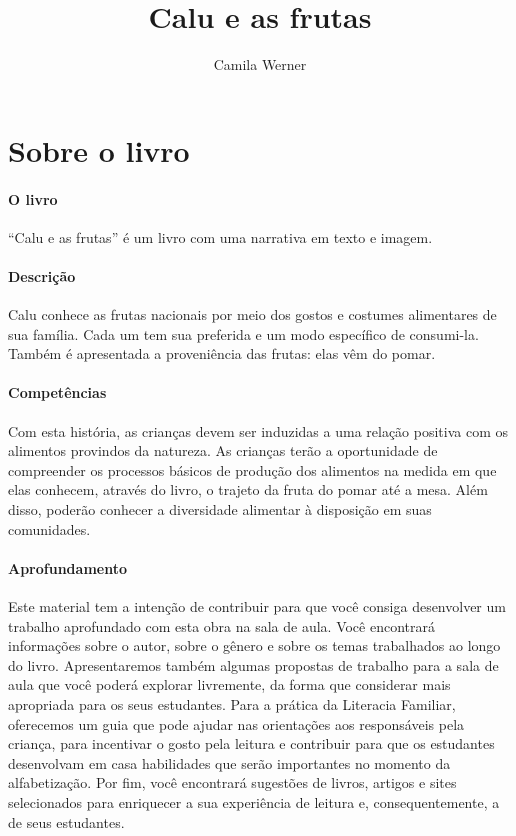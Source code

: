 \documentclass[11pt]{extarticle}
\newcommand{\AutorLivro}{Camila Werner}
\newcommand{\TituloLivro}{Calu e as frutas}
\newcommand{\colaborador}{{Paulo Pompermaier e Renier Silva}}
\begin{document}
\title{\TituloLivro}
\author{\AutorLivro}
\def\authornotes{\colaborador}

\date{}
\maketitle


\tableofcontents



\section{Sobre o livro}

\paragraph{O livro} 
``Calu e as frutas'' é um livro com uma narrativa em texto e imagem. 
\paragraph{Descrição} 
Calu conhece as frutas nacionais por meio dos gostos e costumes alimentares
de sua família. Cada um tem sua preferida e um modo específico de consumi-la.
Também é apresentada a proveniência das frutas: elas vêm do pomar. 
\paragraph{Competências} 
Com esta história, as crianças devem ser induzidas a uma relação
positiva com os alimentos provindos da natureza. As crianças terão
a oportunidade de compreender os processos básicos de produção
dos alimentos na medida em que elas conhecem, através do livro, o trajeto 
da fruta do pomar até a mesa. Além disso, poderão conhecer a diversidade
alimentar à disposição em suas comunidades.

\paragraph{Aprofundamento} 
Este material tem a intenção de contribuir para que você consiga desenvolver um trabalho aprofundado 
com esta obra na sala de aula. Você encontrará informações sobre o autor, sobre 
o gênero e sobre os temas trabalhados ao longo do livro. Apresentaremos também 
algumas propostas de trabalho para a sala de aula que você poderá explorar livremente, 
da forma que considerar mais apropriada para os seus estudantes. Para a prática 
da Literacia Familiar, oferecemos um guia que pode ajudar nas orientações aos 
responsáveis pela criança, para incentivar o gosto pela leitura e contribuir para 
que os estudantes desenvolvam em casa habilidades que serão importantes no momento 
da alfabetização. Por fim, você encontrará sugestões de livros, artigos e sites 
selecionados para enriquecer a sua experiência de leitura e, 
consequentemente, a de seus estudantes.
\end{document}
